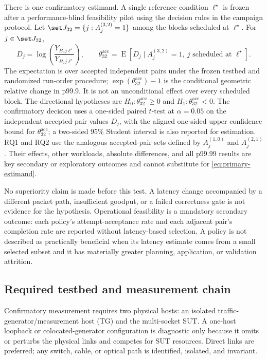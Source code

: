 There is one confirmatory estimand. A single reference condition $\ell^\star$ is frozen after a performance-blind feasibility pilot using the decision rules in the campaign protocol. Let $\set J_{32}=\{j:A_j^{(3,2)}=1\}$ among the blocks scheduled at $\ell^\star$. For $j\in\set J_{32}$,
\begin{equation}
 D_j=\log\!\left(\frac{Y_{B_3j\ell^\star}}{Y_{B_2j\ell^\star}}\right),
 \qquad
 \theta_{32}^{\mathrm{acc}}=\operatorname{E}\!\left[D_j\mid
 A_j^{(3,2)}=1,\ j\text{ scheduled at }\ell^\star\right].
 \label{eq:primary-estimand}
\end{equation}
The expectation is over accepted independent pairs under the frozen testbed and randomized run-order procedure; $\exp(\theta_{32}^{\mathrm{acc}})-1$ is the conditional geometric relative change in p99.9. It is not an unconditional effect over every scheduled block. The directional hypotheses are $H_0:\theta_{32}^{\mathrm{acc}}\geq0$ and $H_1:\theta_{32}^{\mathrm{acc}}<0$. The confirmatory decision uses a one-sided paired $t$-test at $\alpha=0.05$ on the independent accepted-pair values $D_j$, with the aligned one-sided upper confidence bound for $\theta_{32}^{\mathrm{acc}}$; a two-sided 95\% Student interval is also reported for estimation. RQ1 and RQ2 use the analogous accepted-pair sets defined by $A_j^{(1,0)}$ and $A_j^{(2,1)}$. Their effects, other workloads, absolute differences, and all p99.99 results are key secondary or exploratory outcomes and cannot substitute for \cref{eq:primary-estimand}.

No superiority claim is made before this test. A latency change accompanied by a different packet path, insufficient goodput, or a failed correctness gate is not evidence for the hypothesis. Operational feasibility is a mandatory secondary outcome: each policy's attempt-acceptance rate and each adjacent pair's completion rate are reported without latency-based selection. A policy is not described as practically beneficial when its latency estimate comes from a small selected subset and it has materially greater planning, application, or validation attrition.

\subsection{Required testbed and measurement chain}

Confirmatory measurement requires two physical hosts: an isolated traffic-generator/measurement host (TG) and the multi-socket SUT. A one-host loopback or colocated-generator configuration is diagnostic only because it omits or perturbs the physical links and competes for SUT resources. Direct links are preferred; any switch, cable, or optical path is identified, isolated, and invariant.

